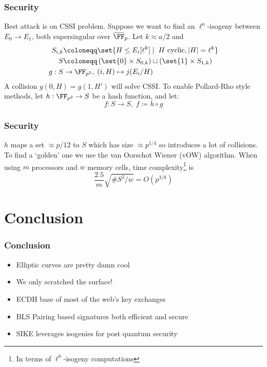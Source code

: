 \documentclass{beamer}
\newcommand{\overbar}[1]{\mkern 1.5mu\overline{\mkern-1.5mu#1\mkern-1.5mu}\mkern 1.5mu}
\begin{document}
\begin{frame}
    \frametitle{Security}
    Best attack is on CSSI problem.
    \pause 
    Suppose we want to find an $\ell^a$-isogeny  between $E_0 \to E_1$, both 
    supersingular over $\overbar{\FF}_p$.
    \pause Let $k \approx a/2$ and
    \begin{align*}
        S_{i, k} &\coloneqq \set{ H \leq E_i[\ell^k] \mid \; H \text{ cyclic}, |H| = \ell^k } \\
        S &\coloneqq \left( \set{0} \times S_{0, k} \right) \sqcup \left( \set{1} \times S_{1, k} \right) \\
        g: S &\to \FF_{p^2}, \; (i, H) \mapsto j(E_{i}/H)
    \end{align*}
    \pause
    A collision $g(0, H) = g(1, H')$ will solve CSSI.
    \pause To enable Pollard-Rho style methods, let $h: \FF_{p^2} \to S$ 
    be a hash function, and let:
    \[ f: S \to S,\; f \coloneqq h \circ g \]
\end{frame}

\begin{frame}
    \frametitle{Security}
    $h$ maps a set $\approx p/12$ to $S$ which has size $\approx p^{1/4}$ so introduces a lot of collisions.
    \pause
    To find a `golden' one we use the van Oorschot Wiener (vOW) algorithm. 
    \pause
    When using $m$ processors and $w$ memory cells, time complexity\footnote{In terms of $\ell^k$-isogeny computations} is 
    \[ \frac{2.5}{m}\sqrt{\#S^3/w} = O(p^{3/8})  \]
\end{frame}

\section{Conclusion}
\begin{frame}
    \frametitle{Conclusion}
    \begin{itemize}
        \item<1-> Elliptic curves are pretty damn cool
        \item<1-> We only scratched the surface!
        \item<2-> ECDH base of most of the web's key exchanges
        \item<3-> BLS Pairing based signatures both efficient and secure
        \item<4-> SIKE leverages isogenies for post quantum security
    \end{itemize}
    

\end{frame}
\end{document}
